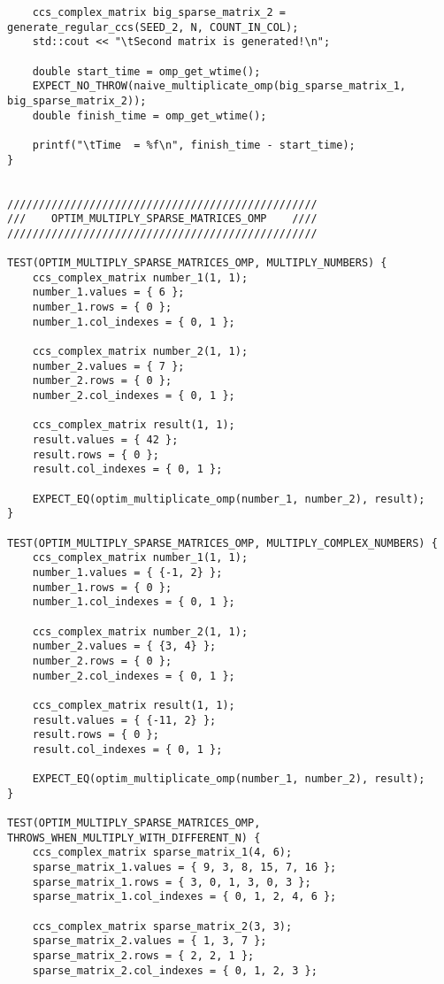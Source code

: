 \documentclass{report}
\begin{document}
\begin{lstlisting}
    ccs_complex_matrix big_sparse_matrix_2 = generate_regular_ccs(SEED_2, N, COUNT_IN_COL);
    std::cout << "\tSecond matrix is generated!\n";

    double start_time = omp_get_wtime();
    EXPECT_NO_THROW(naive_multiplicate_omp(big_sparse_matrix_1, big_sparse_matrix_2));
    double finish_time = omp_get_wtime();

    printf("\tTime  = %f\n", finish_time - start_time);
}


/////////////////////////////////////////////////
///    OPTIM_MULTIPLY_SPARSE_MATRICES_OMP    ////
/////////////////////////////////////////////////

TEST(OPTIM_MULTIPLY_SPARSE_MATRICES_OMP, MULTIPLY_NUMBERS) {
    ccs_complex_matrix number_1(1, 1);
    number_1.values = { 6 };
    number_1.rows = { 0 };
    number_1.col_indexes = { 0, 1 };

    ccs_complex_matrix number_2(1, 1);
    number_2.values = { 7 };
    number_2.rows = { 0 };
    number_2.col_indexes = { 0, 1 };

    ccs_complex_matrix result(1, 1);
    result.values = { 42 };
    result.rows = { 0 };
    result.col_indexes = { 0, 1 };

    EXPECT_EQ(optim_multiplicate_omp(number_1, number_2), result);
}

TEST(OPTIM_MULTIPLY_SPARSE_MATRICES_OMP, MULTIPLY_COMPLEX_NUMBERS) {
    ccs_complex_matrix number_1(1, 1);
    number_1.values = { {-1, 2} };
    number_1.rows = { 0 };
    number_1.col_indexes = { 0, 1 };

    ccs_complex_matrix number_2(1, 1);
    number_2.values = { {3, 4} };
    number_2.rows = { 0 };
    number_2.col_indexes = { 0, 1 };

    ccs_complex_matrix result(1, 1);
    result.values = { {-11, 2} };
    result.rows = { 0 };
    result.col_indexes = { 0, 1 };

    EXPECT_EQ(optim_multiplicate_omp(number_1, number_2), result);
}

TEST(OPTIM_MULTIPLY_SPARSE_MATRICES_OMP, THROWS_WHEN_MULTIPLY_WITH_DIFFERENT_N) {
    ccs_complex_matrix sparse_matrix_1(4, 6);
    sparse_matrix_1.values = { 9, 3, 8, 15, 7, 16 };
    sparse_matrix_1.rows = { 3, 0, 1, 3, 0, 3 };
    sparse_matrix_1.col_indexes = { 0, 1, 2, 4, 6 };

    ccs_complex_matrix sparse_matrix_2(3, 3);
    sparse_matrix_2.values = { 1, 3, 7 };
    sparse_matrix_2.rows = { 2, 2, 1 };
    sparse_matrix_2.col_indexes = { 0, 1, 2, 3 };


\end{lstlisting}
\end{document}
